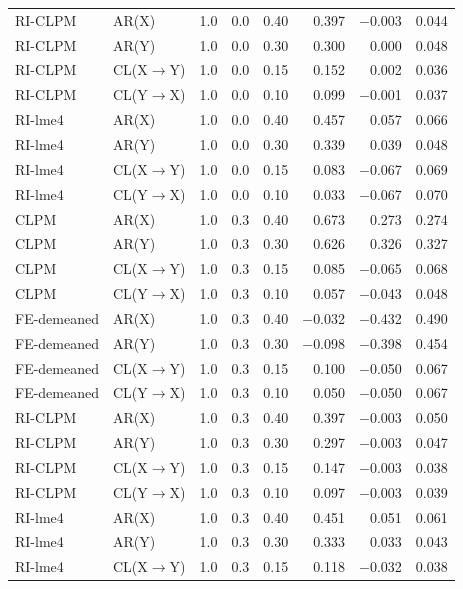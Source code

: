 \documentclass[12pt]{article}
\begin{document}
\begin{table}[H]
\begin{tabular}[t]{llrrrrrr}
\addlinespace
RI-CLPM & AR(X) & 1.0 & 0.0 & 0.40 & 0.397 & $-$0.003 & 0.044\\
RI-CLPM & AR(Y) & 1.0 & 0.0 & 0.30 & 0.300 & 0.000 & 0.048\\
RI-CLPM & CL(X$\rightarrow$Y) & 1.0 & 0.0 & 0.15 & 0.152 & 0.002 & 0.036\\
RI-CLPM & CL(Y$\rightarrow$X) & 1.0 & 0.0 & 0.10 & 0.099 & $-$0.001 & 0.037\\
RI-lme4 & AR(X) & 1.0 & 0.0 & 0.40 & 0.457 & 0.057 & 0.066\\
\addlinespace
RI-lme4 & AR(Y) & 1.0 & 0.0 & 0.30 & 0.339 & 0.039 & 0.048\\
RI-lme4 & CL(X$\rightarrow$Y) & 1.0 & 0.0 & 0.15 & 0.083 & $-$0.067 & 0.069\\
RI-lme4 & CL(Y$\rightarrow$X) & 1.0 & 0.0 & 0.10 & 0.033 & $-$0.067 & 0.070\\
CLPM & AR(X) & 1.0 & 0.3 & 0.40 & 0.673 & 0.273 & 0.274\\
CLPM & AR(Y) & 1.0 & 0.3 & 0.30 & 0.626 & 0.326 & 0.327\\
\addlinespace
CLPM & CL(X$\rightarrow$Y) & 1.0 & 0.3 & 0.15 & 0.085 & $-$0.065 & 0.068\\
CLPM & CL(Y$\rightarrow$X) & 1.0 & 0.3 & 0.10 & 0.057 & $-$0.043 & 0.048\\
FE-demeaned & AR(X) & 1.0 & 0.3 & 0.40 & $-$0.032 & $-$0.432 & 0.490\\
FE-demeaned & AR(Y) & 1.0 & 0.3 & 0.30 & $-$0.098 & $-$0.398 & 0.454\\
FE-demeaned & CL(X$\rightarrow$Y) & 1.0 & 0.3 & 0.15 & 0.100 & $-$0.050 & 0.067\\
\addlinespace
FE-demeaned & CL(Y$\rightarrow$X) & 1.0 & 0.3 & 0.10 & 0.050 & $-$0.050 & 0.067\\
RI-CLPM & AR(X) & 1.0 & 0.3 & 0.40 & 0.397 & $-$0.003 & 0.050\\
RI-CLPM & AR(Y) & 1.0 & 0.3 & 0.30 & 0.297 & $-$0.003 & 0.047\\
RI-CLPM & CL(X$\rightarrow$Y) & 1.0 & 0.3 & 0.15 & 0.147 & $-$0.003 & 0.038\\
RI-CLPM & CL(Y$\rightarrow$X) & 1.0 & 0.3 & 0.10 & 0.097 & $-$0.003 & 0.039\\
\addlinespace
RI-lme4 & AR(X) & 1.0 & 0.3 & 0.40 & 0.451 & 0.051 & 0.061\\
RI-lme4 & AR(Y) & 1.0 & 0.3 & 0.30 & 0.333 & 0.033 & 0.043\\
RI-lme4 & CL(X$\rightarrow$Y) & 1.0 & 0.3 & 0.15 & 0.118 & $-$0.032 & 0.038\\

\end{tabular}
\end{table}
\end{document}
